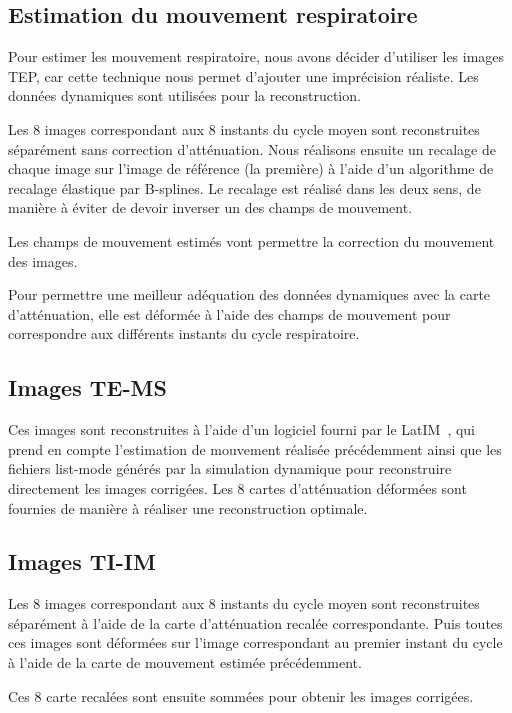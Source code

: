 \subsection{Estimation du mouvement respiratoire}

Pour estimer les mouvement respiratoire, nous avons décider d'utiliser les images TEP, car cette technique nous permet d'ajouter une imprécision réaliste. Les données dynamiques sont utilisées pour la reconstruction.

Les 8 images correspondant aux 8 instants du cycle moyen sont reconstruites séparément sans correction d'atténuation. Nous réalisons ensuite un recalage de chaque image sur l'image de référence (la première) à l'aide d'un algorithme de recalage élastique par B-splines. Le recalage est réalisé dans les deux sens, de manière à éviter de devoir inverser un des champs de mouvement.

Les champs de mouvement estimés vont permettre la correction du mouvement des images. 

Pour permettre une meilleur adéquation des données dynamiques avec la carte d'atténuation, elle est déformée à l'aide des champs de mouvement pour correspondre aux différents instants du cycle respiratoire.

\subsection{Images TE-MS}

Ces images sont reconstruites à l'aide d'un logiciel fourni par le LatIM~\cite{lamare2007list}, qui prend en compte l'estimation de mouvement réalisée précédemment ainsi que les fichiers list-mode générés par la simulation dynamique pour reconstruire directement les images corrigées. Les 8 cartes d'atténuation déformées sont fournies de manière à réaliser une reconstruction optimale.

\subsection{Images TI-IM}

Les 8 images correspondant aux 8 instants du cycle moyen sont reconstruites séparément à l'aide de la carte d'atténuation recalée correspondante. Puis toutes ces images sont déformées sur l'image correspondant au premier instant du cycle à l'aide de la carte de mouvement estimée précédemment.

Ces 8 carte recalées sont ensuite sommées pour obtenir les images corrigées.


